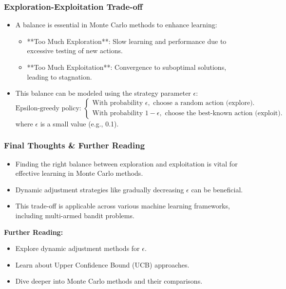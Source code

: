 \documentclass[aspectratio=169]{beamer}
\begin{document}
\begin{frame}[fragile]
    \frametitle{Exploration-Exploitation Trade-off}
    \begin{itemize}
        \item A balance is essential in Monte Carlo methods to enhance learning:
        \begin{itemize}
            \item **Too Much Exploration**: Slow learning and performance due to excessive testing of new actions.
            \item **Too Much Exploitation**: Convergence to suboptimal solutions, leading to stagnation.
        \end{itemize}
        \item This balance can be modeled using the strategy parameter \( \epsilon \):
        \begin{equation}
            \text{Epsilon-greedy policy: } 
            \begin{cases}
                \text{With probability } \epsilon, \text{ choose a random action (explore).} \\
                \text{With probability } 1 - \epsilon, \text{ choose the best-known action (exploit).}
            \end{cases}
        \end{equation}
        where \( \epsilon \) is a small value (e.g., 0.1).
    \end{itemize}
\end{frame}

\begin{frame}[fragile]
    \frametitle{Final Thoughts & Further Reading}
    \begin{itemize}
        \item Finding the right balance between exploration and exploitation is vital for effective learning in Monte Carlo methods.
        \item Dynamic adjustment strategies like gradually decreasing \( \epsilon \) can be beneficial.
        \item This trade-off is applicable across various machine learning frameworks, including multi-armed bandit problems.
    \end{itemize}

    \textbf{Further Reading:}
    \begin{itemize}
        \item Explore dynamic adjustment methods for \( \epsilon \).
        \item Learn about Upper Confidence Bound (UCB) approaches.
        \item Dive deeper into Monte Carlo methods and their comparisons.
    \end{itemize}
\end{frame}
\end{document}
